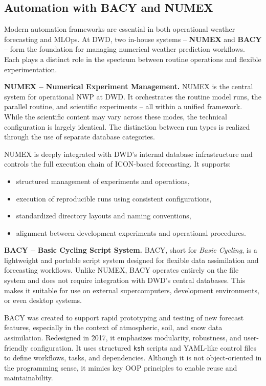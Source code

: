 %
\subsection{Automation with BACY and NUMEX}

Modern automation frameworks are essential in both operational weather forecasting and MLOps. At DWD, two in-house systems -- {\bf NUMEX} and {\bf BACY} -- form the foundation for managing numerical weather prediction workflows. Each plays a distinct role in the spectrum between routine operations and flexible experimentation.

{\bf NUMEX – Numerical Experiment Management.} NUMEX is the central system for operational NWP at DWD. It orchestrates the routine model runs, the parallel routine, and scientific experiments -- all within a unified framework. While the scientific content may vary across these modes, the technical configuration is largely identical. The distinction between run types is realized through the use of separate database categories.

NUMEX is deeply integrated with DWD's internal database infrastructure and controls the full execution chain of ICON-based forecasting. It supports:
\begin{itemize}
	\item structured management of experiments and operations,
	\item execution of reproducible runs using consistent configurations,
	\item standardized directory layouts and naming conventions,
	\item alignment between development experiments and operational procedures.
\end{itemize}

{\bf BACY – Basic Cycling Script System.} BACY, short for {\em Basic Cycling}, is a lightweight and portable script system designed for flexible data assimilation and forecasting workflows. Unlike NUMEX, BACY operates entirely on the file system and does not require integration with DWD's central databases. This makes it suitable for use on external supercomputers, development environments, or even desktop systems.

BACY was created to support rapid prototyping and testing of new forecast features, especially in the context of atmospheric, soil, and snow data assimilation. Redesigned in 2017, it emphasizes modularity, robustness, and user-friendly configuration. It uses structured {\tt ksh} scripts and YAML-like control files to define workflows, tasks, and dependencies. Although it is not object-oriented in the programming sense, it mimics key OOP principles to enable reuse and maintainability.


